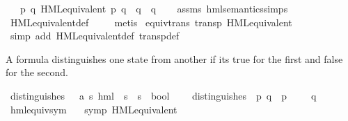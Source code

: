 \begin{isabellebody}
\ \ \ {\isachardoublequoteopen}{\isasymexists}p{\isacharprime}{\kern0pt}\ q{\isacharprime}{\kern0pt}{\isachardot}{\kern0pt}\ {\isacharparenleft}{\kern0pt}HML{\isacharunderscore}{\kern0pt}equivalent\ p{\isacharprime}{\kern0pt}\ q{\isacharprime}{\kern0pt}{\isacharparenright}{\kern0pt}\ {\isasymand}\ q\ {\isasymmapsto}{\isasymalpha}\ q{\isacharprime}{\kern0pt}{\isachardoublequoteclose}\isanewline
%
\isadelimproof
\ \ %
\endisadelimproof
%
\isatagproof
{}\isamarkupfalse%
\ assms\ hml{\isacharunderscore}{\kern0pt}semantics{\isachardot}{\kern0pt}simps\isanewline
\ \ \isamarkupfalse%
\ HML{\isacharunderscore}{\kern0pt}equivalent{\isacharunderscore}{\kern0pt}def\ \isanewline
\ \ \isamarkupfalse%
\ metis%
\endisatagproof
{\isafoldproof}%
%
\isadelimproof
\isanewline
%
\endisadelimproof
\isanewline
\isanewline
{}\isamarkupfalse%
\ equiv{\isacharunderscore}{\kern0pt}trans{\isacharcolon}{\kern0pt}\ {\isachardoublequoteopen}transp\ HML{\isacharunderscore}{\kern0pt}equivalent{\isachardoublequoteclose}\isanewline
%
\isadelimproof
\ \ %
\endisadelimproof
%
\isatagproof
{}\isamarkupfalse%
\ {\isacharparenleft}{\kern0pt}simp\ add{\isacharcolon}{\kern0pt}\ HML{\isacharunderscore}{\kern0pt}equivalent{\isacharunderscore}{\kern0pt}def\ transp{\isacharunderscore}{\kern0pt}def{\isacharparenright}{\kern0pt}%
\endisatagproof
{\isafoldproof}%
%
\isadelimproof
%
\endisadelimproof
%
\begin{isamarkuptext}%
A formula distinguishes one state from another if its true for the
  first and false for the second.%
\end{isamarkuptext}\isamarkuptrue%
\isamarkupfalse%
\ distinguishes\ {\isacharcolon}{\kern0pt}{\isacharcolon}{\kern0pt}\ \ {\isacartoucheopen}{\isacharparenleft}{\kern0pt}{\isacharprime}{\kern0pt}a{\isacharcomma}{\kern0pt}\ {\isacharprime}{\kern0pt}s{\isacharparenright}{\kern0pt}\ hml\ {\isasymRightarrow}\ {\isacharprime}{\kern0pt}s\ {\isasymRightarrow}\ {\isacharprime}{\kern0pt}s\ {\isasymRightarrow}\ bool{\isacartoucheclose}\ \isanewline
\ \ \ {\isacartoucheopen}distinguishes\ {\isasymphi}\ p\ q\ {\isasymequiv}\ p\ {\isasymTurnstile}\ {\isasymphi}\ {\isasymand}\ {\isasymnot}\ q\ {\isasymTurnstile}\ {\isasymphi}{\isacartoucheclose}\isanewline
\isanewline
{}\isamarkupfalse%
\ hml{\isacharunderscore}{\kern0pt}equiv{\isacharunderscore}{\kern0pt}sym{\isacharcolon}{\kern0pt}\isanewline
\ \ \ {\isacartoucheopen}symp\ HML{\isacharunderscore}{\kern0pt}equivalent{\isacartoucheclose}\isanewline

\end{isabellebody}
